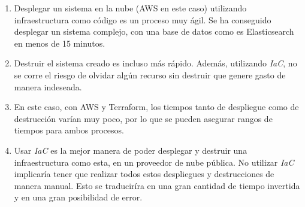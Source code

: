 \documentclass[../../memoria.tex]{subfiles}
\begin{document}
\begin{enumerate}
    \item Desplegar un sistema en la nube (AWS en este caso) utilizando infraestructura como código es un proceso muy ágil. Se ha conseguido desplegar un sistema complejo, con una base de datos como es Elasticsearch en menos de 15 minutos.
    \item Destruir el sistema creado es incluso más rápido. Además, utilizando \textit{IaC}, no se corre el riesgo de olvidar algún recurso sin destruir que genere gasto de manera indeseada.
    \item En este caso, con AWS y Terraform, los tiempos tanto de despliegue como de destrucción varían muy poco, por lo que se pueden asegurar rangos de tiempos para ambos procesos.
    \item Usar \textit{IaC} es la mejor manera de poder desplegar y destruir una infraestructura como esta, en un proveedor de nube pública. No utilizar \textit{IaC} implicaría tener que realizar todos estos despliegues y destrucciones de manera manual. Esto se traduciríra en una gran cantidad de tiempo invertida y en una gran posibilidad de error.
\end{enumerate}
\end{document}
